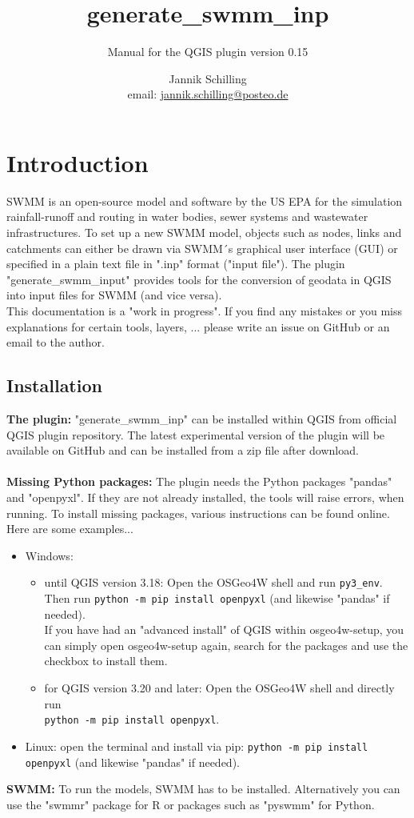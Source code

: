 \documentclass[10pt,a4paper,oneside]{scrbook}
\title{generate\_swmm\_inp}
\subtitle{Manual for the QGIS plugin version 0.15}
\author{Jannik Schilling \\ email: \href{mailto:jannik.schilling@posteo.de}{jannik.schilling@posteo.de}}
\newcommand{\lil}[1]{\lstinline{#1}}
\begin{document}
\maketitle
\tableofcontents

\chapter{Introduction}
SWMM is an open-source model and software by the US EPA for the simulation rainfall-runoff and routing in water bodies, sewer systems and wastewater infrastructures. To set up a new SWMM model, objects such as nodes, links and catchments can either be drawn via SWMM´s graphical user interface (GUI) or specified in a plain text file in ".inp" format ("input file"). The plugin "generate\_swmm\_input" provides tools for the conversion of geodata in QGIS into input files for SWMM (and vice versa). \\
This documentation is a "work in progress". If you find any mistakes or you miss explanations for certain tools,  layers, ... please write an issue on GitHub or an email to the author.

\section{Installation}
\textbf{The plugin:} "generate\_swmm\_inp" can be installed within QGIS from official QGIS plugin repository. The latest experimental version of the plugin will be available on GitHub and can be installed from a zip file after download. \\
\\
\textbf{Missing Python packages:} The plugin needs the Python packages "pandas" and "openpyxl". If they are not already installed, the tools will raise errors, when running. To install missing packages, various instructions can be found online. Here are some examples...
\begin{itemize}
	\item Windows:
	\begin{itemize}
		\item until QGIS version 3.18: Open the OSGeo4W shell and run \colorbox{mygray}{\lil{py3_env}}. 
		\\Then run \colorbox{mygray}{\lil{python -m pip install openpyxl}} (and likewise "pandas" if needed).
		\\If you have had an "advanced install" of QGIS within osgeo4w-setup, you can simply open osgeo4w-setup again, search for the packages and use the checkbox to install them.
		\item for QGIS version 3.20 and later: 
		Open the OSGeo4W shell and directly run\\
		\colorbox{mygray}{\lil{python -m pip install openpyxl}}.
	\end{itemize}
	\item Linux: open the terminal and install via pip: 
	\colorbox{mygray}{\lil{python -m pip install openpyxl}} (and likewise "pandas" if needed).
\end{itemize} 
\textbf{SWMM:} To run the models, SWMM has to be installed. Alternatively you can use the "swmmr" package for R or packages such as "pyswmm" for Python. \\
\end{document}
